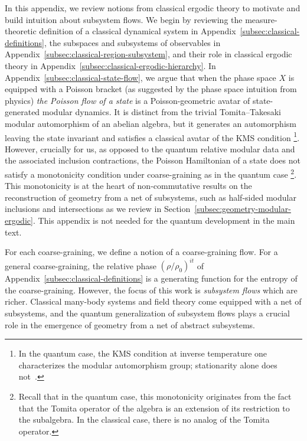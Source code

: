 \documentclass[a4paper,11pt]{article}
\theoremstyle{definition}
\begin{document}
In this appendix, we review notions from classical ergodic theory to motivate and build intuition about subsystem flows.
We begin by reviewing the measure-theoretic definition of a classical dynamical system in Appendix~\ref{subsec:classical-definitions}, the subspaces and subsystems of observables in Appendix~\ref{subsec:classical-region-subsystem}, and their role in classical ergodic theory in Appendix~\ref{subsec:classical-ergodic-hierarchy}. In Appendix~\ref{subsec:classical-state-flow}, we argue that when the phase space $X$ is equipped with a Poisson bracket (as suggested by the phase space intuition from physics) {\it the Poisson flow of a state} is a Poisson-geometric avatar of state-generated modular dynamics. It is distinct from the trivial Tomita--Takesaki modular automorphism of an abelian algebra, but it generates an automorphism leaving the state invariant and satisfies a classical avatar of the KMS condition \footnote{In the quantum case, the KMS condition at inverse temperature one characterizes the modular automorphism group; stationarity alone does not~\cite{Takesaki1970}.}. However, crucially for us, as opposed to the quantum relative modular data and the associated inclusion contractions, the Poisson Hamiltonian of a state does not satisfy a monotonicity condition under coarse-graining as in the quantum case \footnote{Recall that in the quantum case, this monotonicity originates from the fact that the Tomita operator of the algebra is an extension of its restriction to the subalgebra. In the classical case, there is no analog of the Tomita operator.}. This monotonicity is at the heart of non-commutative results on the reconstruction of geometry from a net of subsystems, such as half-sided modular inclusions and intersections as we review in Section~\ref{subsec:geometry-modular-ergodic}. This appendix is not needed for the quantum development in the main text.

For each coarse-graining, we define a notion of a coarse-graining flow. For a general coarse-graining, the relative phase $(\rho/\rho_0)^{it}$ of Appendix~\ref{subsec:classical-definitions} is a generating function for the entropy of the coarse-graining. However, the focus of this work is {\it subsystem flows} which are richer.
Classical many-body systems and field theory come equipped with a net of subsystems, and the quantum generalization of subsystem flows plays a crucial role in the emergence of geometry from a net of abstract subsystems.
\end{document}
